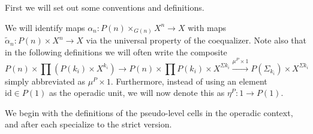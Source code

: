 %
%
First we will set out some conventions and definitions.
\begin{conv}
We will identify maps $\alpha_n \colon P(n) \times_{G(n)} X^n \rightarrow X$ with maps $\tilde{\alpha}_n \colon P(n) \times X^n \rightarrow X$ via the universal property of the coequalizer. Note also that in the following definitions we will often write the composite
    \[
        P(n) \times \prod(P(k_i) \times X^{k_i}) \rightarrow P(n) \times \prod P(k_i) \times X^{\Sigma k_i} \xrightarrow{\mu^P \times 1} P(\Sigma_{k_i}) \times X^{\Sigma k_i}
    \]
simply abbreviated as $\mu^P \times 1$.  Furthermore, instead of using an element $\textrm{id} \in P(1)$ as the operadic unit, we will now denote this as $\eta^{P}:1 \rightarrow P(1)$.
\end{conv}

We begin with the definitions of the pseudo-level cells in the operadic context, and after each specialize to the strict version.

